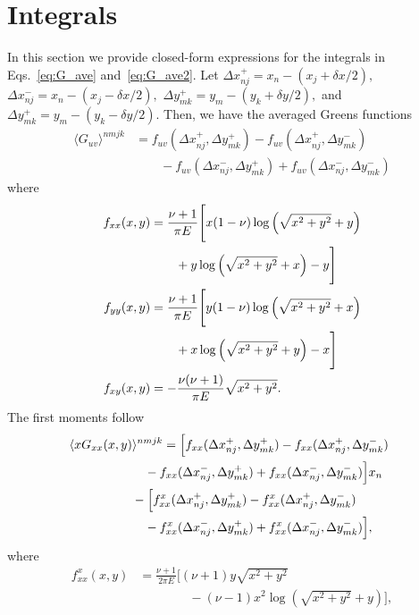 \documentclass[aps,prl,reprint,twocolumn,groupedaddress,showpacs]{revtex4-1}
\begin{document}
\section{Integrals }
In this section we provide closed-form expressions for the integrals in Eqs.~\ref{eq:G_ave} and~\ref{eq:G_ave2}.
Let $\Delta x_{nj}^+ = x_n - (x_j+\delta x/2),$ $\Delta x_{nj}^- = x_n - (x_j-\delta x/2),$ $\Delta y_{mk}^+ = y_m - (y_k+\delta y/2),$ and $\Delta y_{mk}^+ = y_m - (y_k-\delta y/2).$ Then,
we have the averaged Greens functions
\begin{align}
\langle G_{uv}\rangle^{nmjk} &=   f_{uv}( \Delta x_{nj}^+,\Delta y_{mk}^+) - f_{uv}( \Delta x_{nj}^+,\Delta y_{mk}^-)  \nonumber \\
&\qquad -f_{uv}(\Delta x_{nj}^-, \Delta y_{mk}^+) + f_{uv}(\Delta x_{nj}^- , \Delta y_{mk}^-)
\end{align}
where
\begin{align}\allowdisplaybreaks
f_{xx}(x,y) &= \frac{\nu+1}{\pi E}\Bigg[ x(1-\nu ) \log\left( \sqrt{x^2+y^2}+y\right) \nonumber\\
&\qquad+ y \log\left(\sqrt{x^2+y^2} +x\right)-y  \Bigg] \\
f_{yy}(x,y) &= \frac{\nu+1}{\pi E}\Bigg[ y(1-\nu ) \log\left( \sqrt{x^2+y^2}+x\right) \nonumber\\
&\qquad+ x \log\left(\sqrt{x^2+y^2} +y\right)-x  \Bigg] \\
f_{xy}(x,y) &= -\frac{\nu(\nu+1)}{\pi E}\sqrt{x^2+y^2}.
\end{align}
The first moments follow
\begin{align}
\lefteqn{\langle xG_{xx}(x,y) \rangle^{nmjk} =\Big[ f_{xx}( \Delta x_{nj}^+,\Delta y_{mk}^+)- f_{xx}( \Delta x_{nj}^+,\Delta y_{mk}^-)}\nonumber\\
 &\qquad\qquad\qquad   -f_{xx}(\Delta x_{nj}^-, \Delta y_{mk}^+)+ f_{xx}(\Delta x_{nj}^- , \Delta y_{mk}^-)\Big] x_n\nonumber\\
 &\quad\qquad\qquad   - \Big[ f^x_{xx}( \Delta x_{nj}^+ , \Delta y_{mk}^+)- f^x_{xx}( \Delta x_{nj}^+ , \Delta y_{mk}^-) \nonumber\\
 &\qquad\qquad\qquad-f^x_{xx}(\Delta x_{nj}^-, \Delta y_{mk}^+) + f^x_{xx}(\Delta x_{nj}^- , \Delta y_{mk}^-)\Big],
\end{align}
where
\begin{align}
f^x_{xx}(x,y) &= \frac{\nu+1}{2\pi E} \Big[ (\nu+1)y\sqrt{x^2 + y^2} \nonumber\\
&\qquad\qquad- (\nu-1) x^2\log\left(\sqrt{x^2 + y^2} +y  \right)  \Big],
\end{align}
\end{document}
